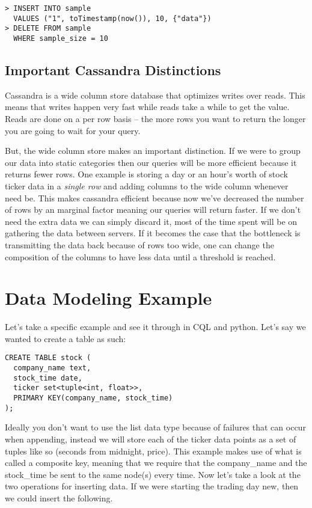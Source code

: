 \documentclass[9pt,twocolumn,twoside]{idsi}
\begin{document}
\begin{lstlisting}
> INSERT INTO sample 
  VALUES ("1", toTimestamp(now()), 10, {"data"})
> DELETE FROM sample 
  WHERE sample_size = 10
\end{lstlisting}

\subsection{Important Cassandra Distinctions}

Cassandra is a wide column store database that optimizes writes over reads. This means that writes happen very fast while reads take a while to get the value. Reads are done on a per row basis -- the more rows you want to return the longer you are going to wait for your query.

But, the wide column store makes an important distinction. If we were to group our data into static categories then our queries will be more efficient because it returns fewer rows. One example is storing a day or an hour's worth of stock ticker data in a \textit{single row} and adding columns to the wide column whenever need be. This makes cassandra efficient because now we've decreased the number of rows by an marginal factor meaning our queries will return faster. If we don't need the extra data we can simply discard it, most of the time spent will be on gathering the data between servers. If it becomes the case that the bottleneck is transmitting the data back because of rows too wide, one can change the composition of the columns to have less data until a threshold is reached.

\section{Data Modeling Example}

Let's take a specific example and see it through in CQL and python. Let's say we wanted to  create a table as such:

\begin{lstlisting}[breaklines]
CREATE TABLE stock (
  company_name text,
  stock_time date,
  ticker set<tuple<int, float>>,
  PRIMARY KEY(company_name, stock_time)
);
\end{lstlisting}

Ideally you don’t want to use the list data type because of failures that can occur when appending, instead we will store each of the ticker data points as a set of tuples like so (seconds from midnight, price). This example makes use of what is called a composite key, meaning that we require that the company\_name and the stock\_time be sent to the same node(s) every time. Now let's take a look at the two operations for inserting data. If we were starting the trading day new, then we could insert the following.
\end{document}
